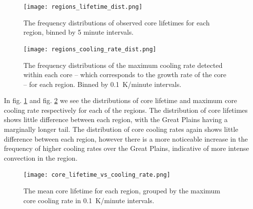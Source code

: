 \begin{figure}[t]
    \centering
    \texttt{[image: regions\_lifetime\_dist.png]}
    \caption{The frequency distributions of observed core lifetimes for each region, binned by 5 minute intervals.}
    \label{fig:region_core_lifetimes}
\end{figure}

\begin{figure}[h]
    \centering
    \texttt{[image: regions\_cooling\_rate\_dist.png]}
    \caption{The frequency distributions of the maximum cooling rate detected within each core -- which corresponds to the growth rate of the core -- for each region. Binned by 0.1~K/minute intervals.}
    \label{fig:region_cooling_rate}
\end{figure}

In fig. \ref{fig:region_core_lifetimes} and fig. \ref{fig:region_cooling_rate} we see the distributions of core lifetime and maximum core cooling rate respectively for each of the regions.
The distribution of core lifetimes shows little difference between each region, with the Great Plains having a marginally longer tail.
The distribution of core cooling rates again shows little difference between each region, however there is a more noticeable increase in the frequency of higher cooling rates over the Great Plains, indicative of more intense convection in the region.







\begin{figure}[t]
    \centering
    \texttt{[image: core\_lifetime\_vs\_cooling\_rate.png]}
    \caption{The mean core lifetime for each region, grouped by the maximum core cooling rate in 0.1~K/minute intervals.}
    \label{fig:lifetime_vs_tod}
\end{figure}

